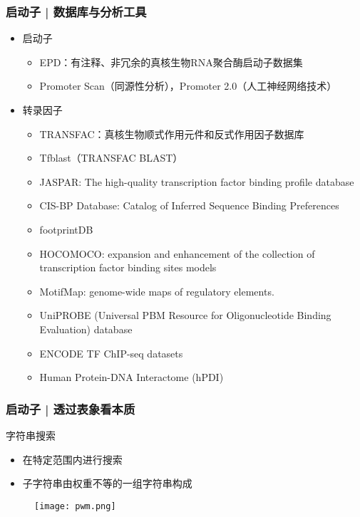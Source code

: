 \begin{frame}
  \frametitle{启动子 | 数据库与分析工具}
  \begin{itemize}
    \item 启动子
      \begin{itemize}
	\item EPD：有注释、非冗余的真核生物RNA聚合酶启动子数据集
        \item Promoter Scan（同源性分析），Promoter 2.0（人工神经网络技术）
      \end{itemize}
    \item 转录因子
      \begin{itemize}
        \item TRANSFAC：真核生物顺式作用元件和反式作用因子数据库
        \item Tfblast（TRANSFAC BLAST）
        \item JASPAR: The high-quality transcription factor binding profile database
        \item CIS-BP Database: Catalog of Inferred Sequence Binding Preferences
        \item footprintDB
        \item HOCOMOCO: expansion and enhancement of the collection of transcription factor binding sites models
        \item MotifMap: genome-wide maps of regulatory elements.
        \item UniPROBE (Universal PBM Resource for Oligonucleotide Binding Evaluation) database
        \item ENCODE TF ChIP-seq datasets
        \item Human Protein-DNA Interactome (hPDI)
      \end{itemize}
  \end{itemize}
\end{frame}

\begin{frame}
  \frametitle{启动子 | 透过表象看本质}
  \begin{block}{字符串搜索}
    \begin{itemize}
      \item 在特定范围内进行搜索
      \item 子字符串由权重不等的一组字符串构成
    \end{itemize}
  \end{block}
  \pause
  \begin{figure}
    \centering
    \texttt{[image: pwm.png]}
  \end{figure}
\end{frame}

